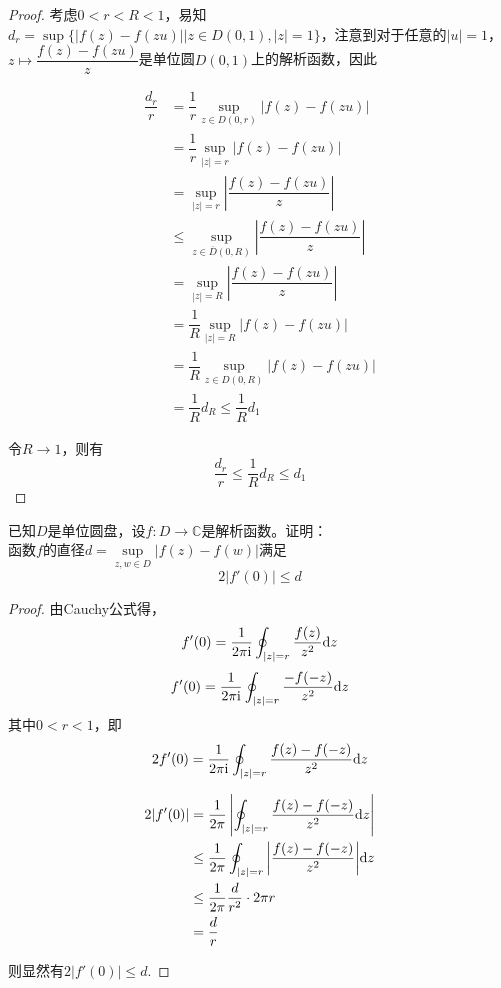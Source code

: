 \begin{proof}

    考虑$0 < r < R < 1$，易知$d_r = \sup\{|f(z) - f(zu)| \big| z \in D(0, 1), |z| = 1 \}$，注意到对于任意的$|u| = 1$，$z \mapsto  \dfrac{f(z) - f(zu)}{z}$是单位圆$D(0, 1)$上的解析函数，因此
    
    \begin{align*}
        \dfrac{d_r}{r} & = \dfrac{1}{r} \sup_{z \in D(0, r)}{|f(z) - f(zu)|} \\
        & = \dfrac{1}{r} \sup_{|z| = r}{|f(z) - f(zu)|} \\
        & = \sup_{|z| = r}{\left| \dfrac{f(z) - f(zu)}{z} \right|} \\
        & \leq \sup_{z \in \overline{D}(0, R)}{\left| \dfrac{f(z) - f(zu)}{z} \right|} \\
        & = \sup_{|z| = R}{\left| \dfrac{f(z) - f(zu)}{z} \right|} \\
        & = \dfrac{1}{R} \sup_{|z| = R}{|f(z) - f(zu)|} \\
        & = \dfrac{1}{R} \sup_{z \in D(0, R)}{|f(z) - f(zu)|} \\
        & = \dfrac{1}{R} d_{R} \leq \dfrac{1}{R} d_{1}
    \end{align*}

    令$R \to 1$，则有
    \[\dfrac{d_{r}}{r} \leq \dfrac{1}{R} d_{R} \leq d_1\]

\end{proof}

\begin{proposition}

    已知$D$是单位圆盘，设$f:D \to \mathbb{C}$是解析函数。证明：\\
    函数$f$的直径$d = \sup\limits_{z, w \in D}{|f(z) - f(w)|}$满足
    \[2|f'(0)| \leq d\]

\end{proposition}

\begin{proof}

    由\textup{Cauchy}公式得，
    \[f'(0) = \dfrac{1}{2\pi \mathrm{i}} \oint_{|z| = r}{\dfrac{f(z)}{z^2}}\mathrm{d} z\]
    \[f'(0) = \dfrac{1}{2\pi \mathrm{i}} \oint_{|z| = r}{\dfrac{-f(-z)}{z^2}}\mathrm{d} z\]
    其中$0 < r < 1$，即
    \[2f'(0) = \dfrac{1}{2\pi \mathrm{i}} \oint_{|z| = r}{\dfrac{f(z) - f(-z)}{z^2}}\mathrm{d} z\]

    \begin{align*}
        2|f'(0)| & = \dfrac{1}{2 \pi} \left| \oint_{|z| = r}{\dfrac{f(z) - f(-z)}{z^2}}\mathrm{d} z \right| \\
        & \leq \dfrac{1}{2 \pi} \oint_{|z| = r}{\left| \dfrac{f(z) - f(-z)}{z^2} \right|}\mathrm{d} z \\
        & \leq \dfrac{1}{2 \pi} \dfrac{d}{r^2} \cdot 2 \pi r \\
        & = \dfrac{d}{r}
    \end{align*}

    则显然有$2|f'(0)| \leq d$.

\end{proof}

